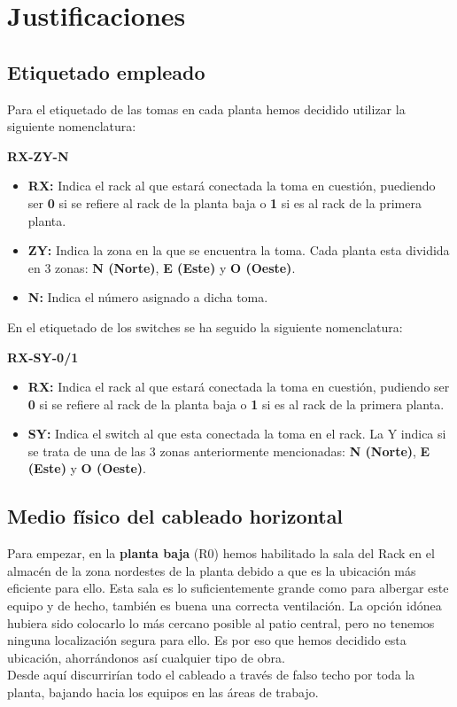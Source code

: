 \section{Justificaciones}
\subsection{Etiquetado empleado}
Para el etiquetado de las tomas en cada planta hemos decidido utilizar la siguiente nomenclatura:
\begin{center}
    \textbf{RX-ZY-N}
\end{center}

\begin{itemize}
    \item \textbf{RX:} Indica el rack al que estará conectada la toma en cuestión, puediendo ser \textbf{0} si se refiere al rack de la planta baja o \textbf{1} si es al rack de la primera planta.
    \item \textbf{ZY:} Indica la zona en la que se encuentra la toma. Cada planta esta dividida en 3 zonas: \textbf{N (Norte)}, \textbf{E (Este)} y \textbf{O (Oeste)}.
    \item \textbf{N:} Indica el número asignado a dicha toma.
\end{itemize}

En el etiquetado de los switches se ha seguido la siguiente nomenclatura:

\begin{center}
    \textbf{RX-SY-0/1}
\end{center}

\begin{itemize}
    \item \textbf{RX:} Indica el rack al que estará conectada la toma en cuestión, pudiendo ser \textbf{0} si se refiere al rack de la planta baja o \textbf{1} si es al rack de la primera planta.
    \item \textbf{SY:} Indica el switch al que esta conectada la toma en el rack. La Y indica si se trata de una de las 3 zonas anteriormente mencionadas: \textbf{N (Norte)}, \textbf{E (Este)} y \textbf{O (Oeste)}.
\end{itemize}

\subsection{Medio físico del cableado horizontal}
Para empezar, en la \textbf{planta baja} (R0) hemos habilitado la sala del Rack en el almacén de la zona nordestes de la planta debido a que es la ubicación más eficiente para ello. Esta sala es lo suficientemente grande como para albergar este equipo y de hecho, también es buena una correcta ventilación. La opción idónea hubiera sido colocarlo lo más cercano posible al patio central, pero no tenemos ninguna localización segura para ello. Es por eso que hemos decidido esta ubicación, ahorrándonos así cualquier tipo de obra. \\ Desde aquí discurrirían todo el cableado a través de falso techo por toda la planta, bajando hacia los equipos en las áreas de trabajo.\\


